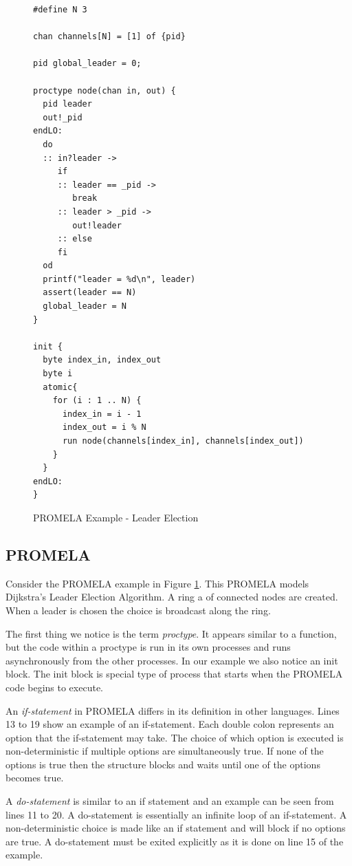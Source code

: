 \documentclass[11pt,twocolumn]{article}
\begin{document}

\begin{figure}
   \caption{PROMELA Example - Leader Election}
  \label{fig:promelaExample}

\begin{lstlisting}
#define N 3

chan channels[N] = [1] of {pid}

pid global_leader = 0;

proctype node(chan in, out) {
  pid leader
  out!_pid
endLO:
  do
  :: in?leader -> 
	 if
	 :: leader == _pid ->
		break
	 :: leader > _pid ->
		out!leader
	 :: else
	 fi
  od
  printf("leader = %d\n", leader)
  assert(leader == N)
  global_leader = N
}

init {
  byte index_in, index_out
  byte i
  atomic{
	for (i : 1 .. N) {
	  index_in = i - 1
	  index_out = i % N
	  run node(channels[index_in], channels[index_out])
	}
  }
endLO:
}
\end{lstlisting}
\end{figure}
\subsection{PROMELA}

Consider the PROMELA example in Figure 
\ref{fig:promelaExample}. This PROMELA models Dijkstra's Leader Election Algorithm. A ring a of connected nodes are created. When a leader is chosen the choice is broadcast along the ring.

The first thing we notice is the term \emph{proctype}. It appears similar to a function, but the code within a proctype is run in its own processes and runs asynchronously from the other processes. In our example we also notice an init block. The init block is special type of process that starts when the PROMELA code begins to execute. 


An \emph{if-statement} in PROMELA differs in its definition in other languages. Lines 13 to 19 show an example of an if-statement. Each double colon represents an option that the if-statement may take. The choice of which option is executed is non-deterministic if multiple options are simultaneously true. If none of the options is true then the structure blocks and waits until one of the options becomes true.

A \emph{do-statement}  is similar to an if statement and an example can be seen from lines 11 to 20. A do-statement is essentially an infinite loop of an if-statement. A non-deterministic choice is made like an if statement and will block if no options are true. A do-statement must be exited explicitly as it is done on line 15 of the example.
\end{document}
